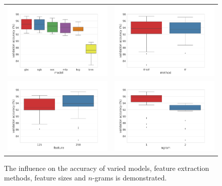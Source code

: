 \documentclass[a4paper,12pt,nottoc]{article}
\begin{document}
\begin{figure}[h]
\begin{center}
\begin{tabular}{c c}
\includegraphics[width=8cm]{../2_project/output/model_performance.png} & \includegraphics[width=8cm]{../2_project/output/method_performance.png} \\
\includegraphics[width=8cm]{../2_project/output/feature_performance.png} & \includegraphics[width=8cm]{../2_project/output/ngram_performance.png} \\
\end{tabular}
\end{center}
\caption{The influence on the accuracy of varied models, feature extraction methods, feature sizes and $n$-grams is demonstrated.}\label{fig:influenceparams}
\end{figure}
\end{document}
